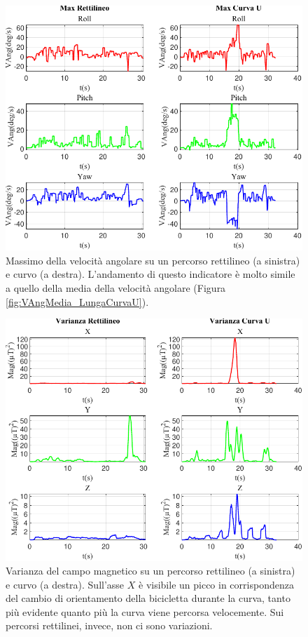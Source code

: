 \documentclass[class=article]{standalone}
\begin{document}
	\begin{center}
		\begin{figure}[h!]
			\centering\includegraphics[width=.7\textwidth]{img/LungaCurvaU/VAng/Max}
			\caption[]{Massimo della velocità angolare su un percorso rettilineo (a sinistra) e curvo (a destra). L'andamento di questo indicatore è molto simile a quello della media della velocità angolare (Figura \ref{fig:VAngMedia_LungaCurvaU}).}
			\label{fig:VAngMax_LungaCurvaU}
		\end{figure}
	\end{center}

	\begin{center}
		\begin{figure}[h!]
			\centering\includegraphics[width=.7\textwidth]{img/LungaCurvaU/Mag/Varianza}
			\caption[]{Varianza del campo magnetico su un percorso rettilineo (a sinistra) e curvo (a destra). Sull'asse \(X\) è visibile un picco in corrispondenza del cambio di orientamento della bicicletta durante la curva, tanto più evidente quanto più la curva viene percorsa velocemente. Sui percorsi rettilinei, invece, non ci sono variazioni.}
			\label{fig:MagVar_LungaCurvaU}
		\end{figure}
	\end{center}
	
\end{document}
